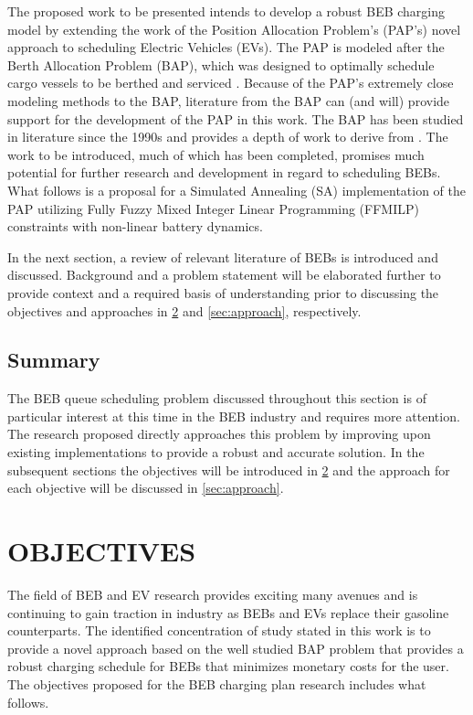 \documentclass[ee,msthesis]{usuthesis}
\begin{document}
The proposed work to be presented intends to develop a robust BEB charging model by extending the work of the Position
Allocation Problem's (PAP's) novel approach to scheduling Electric Vehicles (EVs). The PAP is modeled after the Berth
Allocation Problem (BAP), which was designed to optimally schedule cargo vessels to be berthed and serviced
\cite{buhrkal-2011-model-discr,imai-2001-dynam-berth,frojan-2015-contin-berth}. Because of the PAP's extremely
close modeling methods to the BAP, literature from the BAP can (and will) provide support for the development of the PAP
in this work. The BAP has been studied in literature since the 1990s and provides a depth of work to derive from
\cite{rodrigues-2022-berth}. The work to be introduced, much of which has been completed, promises much potential for
further research and development in regard to scheduling BEBs. What follows is a proposal for a Simulated Annealing (SA)
implementation of the PAP utilizing Fully Fuzzy Mixed Integer Linear Programming (FFMILP) constraints with non-linear
battery dynamics.

In the next section, a review of relevant literature of BEBs is introduced and discussed. Background and a problem
statement will be elaborated further to provide context and a required basis of understanding prior to discussing the
objectives and approaches in \ref{sec:objectives} and \ref{sec:approach}, respectively.

\section{Summary}
\label{sec:intro-summary}
The BEB queue scheduling problem discussed throughout this section is of particular interest at this time in the BEB
industry and requires more attention. The research proposed directly approaches this problem by improving upon existing
implementations to provide a robust and accurate solution. In the subsequent sections the objectives will be introduced
in \ref{sec:objectives} and the approach for each objective will be discussed in \ref{sec:approach}.
\chapter{OBJECTIVES}
\label{sec:objectives}
The field of BEB and EV research provides exciting many avenues and is continuing to gain traction in industry as BEBs
and EVs replace their gasoline counterparts. The identified concentration of study stated in this work is to provide a
novel approach based on the well studied BAP problem that provides a robust charging schedule for BEBs that minimizes
monetary costs for the user. The objectives proposed for the BEB charging plan research includes what follows.
\end{document}
